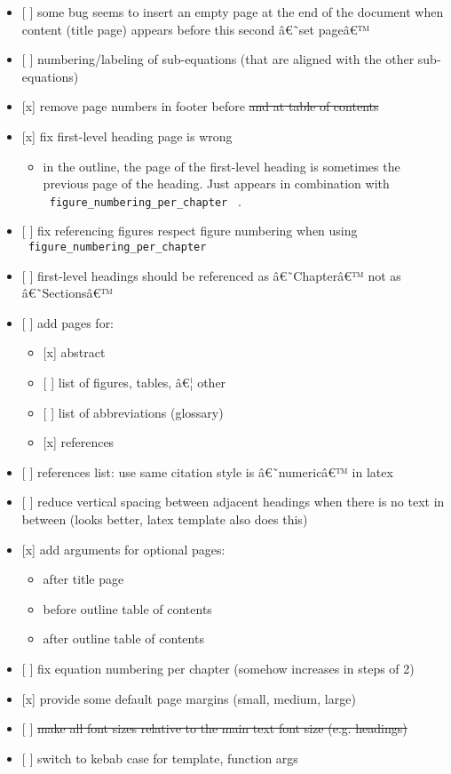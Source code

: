 \begin{itemize}
\tightlist
\item
  {[} {]} some bug seems to insert an empty page at the end of the
  document when content (title page) appears before this second â€˜set
  pageâ€™
\item
  {[} {]} numbering/labeling of sub-equations (that are aligned with the
  other sub-equations)
\item
  {[}x{]} remove page numbers in footer before \st{and at table of
  contents}
\item
  {[}x{]} fix first-level heading page is wrong

  \begin{itemize}
  \tightlist
  \item
    in the outline, the page of the first-level heading is sometimes the
    previous page of the heading. Just appears in combination with
    \texttt{\ figure\_numbering\_per\_chapter\ } .
  \end{itemize}
\item
  {[} {]} fix referencing figures respect figure numbering when using
  \texttt{\ figure\_numbering\_per\_chapter\ }
\item
  {[} {]} first-level headings should be referenced as â€˜Chapterâ€™ not
  as â€˜Sectionsâ€™
\item
  {[} {]} add pages for:

  \begin{itemize}
  \tightlist
  \item
    {[}x{]} abstract
  \item
    {[} {]} list of figures, tables, â€¦ other
  \item
    {[} {]} list of abbreviations (glossary)
  \item
    {[}x{]} references
  \end{itemize}
\item
  {[} {]} references list: use same citation style is â€˜numericâ€™ in
  latex
\item
  {[} {]} reduce vertical spacing between adjacent headings when there
  is no text in between (looks better, latex template also does this)
\item
  {[}x{]} add arguments for optional pages:

  \begin{itemize}
  \tightlist
  \item
    after title page
  \item
    before outline table of contents
  \item
    after outline table of contents
  \end{itemize}
\item
  {[} {]} fix equation numbering per chapter (somehow increases in steps
  of 2)
\item
  {[}x{]} provide some default page margins (small, medium, large)
\item
  {[} {]} \st{make all font sizes relative to the main text font size
  (e.g. headings)}
\item
  {[} {]} switch to kebab case for template, function args
\end{itemize}

